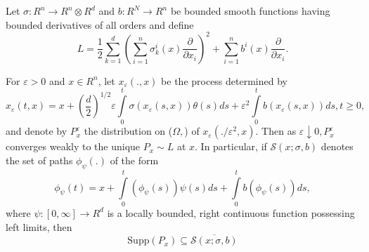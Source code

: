 \setcounter{coro}{10}
\begin{coro}\label{chap2:coro2.11} %
Let $\sigma : R^n \rightarrow R^n \otimes R^d$ and $b : R^N
\rightarrow R^n$ be bounded smooth functions having bounded
derivatives of all orders and define 
\begin{equation*}
L= \frac{1}{2} \sum^d_{k=1} ( \sum^n_{i=1} \sigma^i_k (x)
\frac{\partial}{\partial x_i})^2 + \sum^n_{i=1} b^i (x)
\frac{\partial}{\partial x_i}. \tag{2.12}\label{chap2:eq2.12}  
\end{equation*}

For $\varepsilon > 0$ and $x \in R^n$, let
$x_\varepsilon(.,x)$ be the process determined by 
\begin{equation*}
x_\varepsilon (t,x) = x + \left(\frac{d}{2}\right)^{1/2}\varepsilon
\int\limits^t_0 
\sigma(x_\varepsilon(s,x)) \theta (s) ds+ \varepsilon^2 \int
\limits^t_0 b(x_\varepsilon(s,x)) ds, t \ge 0, \tag{2.13}\label{chap2:eq2.13}  
\end{equation*}
and denote by $P^\varepsilon_x$ the distribution on ($\Omega,$) of
$x_\varepsilon (./ \varepsilon^2 ,x)$. Then as $\varepsilon \downarrow
0, P^\varepsilon_x$ converges weakly to the unique $P_x \sim L$ at
$x$. In particular, if $\mathscr{S}(x; \sigma , b)$ denotes the set of paths
$\phi_\psi(.)$ of the form 
\begin{equation*}
\phi_\psi(t) = x + \int \limits^t_0 (\phi_\psi(s))\psi(s) ds + \int
\limits^t_0 b(\phi_\psi(s)) ds, \tag{2.14}\label{chap2:eq2.14}  
\end{equation*}\pageoriginale
where $\psi : [0, \infty] \rightarrow R^d$ is a locally bounded, right
continuous function possessing left limits, then  
$$
\text{Supp}(P_x) \subseteq \overline{\mathscr{S} (x; \sigma , b)} 
$$
\end{coro}

